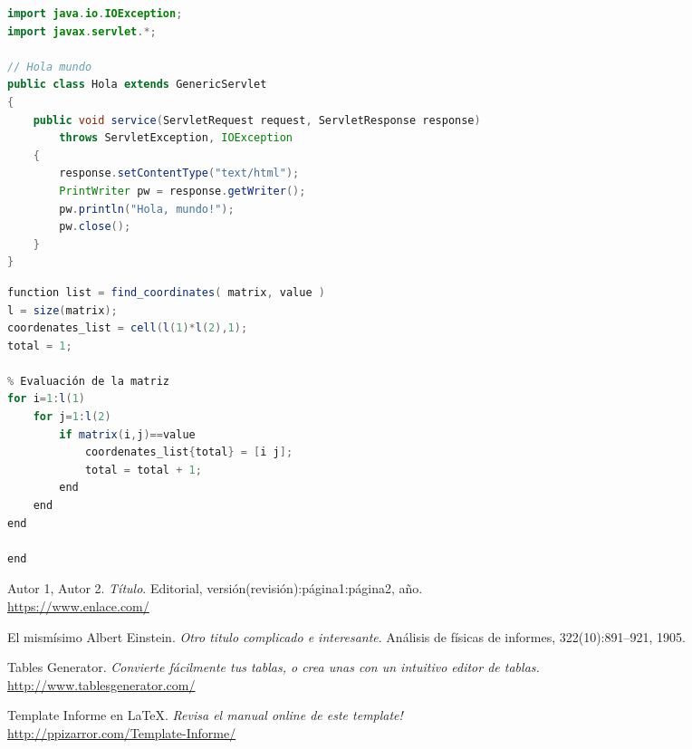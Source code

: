\lstset{style=Java}
\begin{lstlisting}[language=Java, caption=Ejemplo en Java]
import java.io.IOException; 
import javax.servlet.*;

// Hola mundo
public class Hola extends GenericServlet 
{
    public void service(ServletRequest request, ServletResponse response)
        throws ServletException, IOException
    {
        response.setContentType("text/html");
        PrintWriter pw = response.getWriter();
        pw.println("Hola, mundo!");
        pw.close();
    }
}
\end{lstlisting}


\lstset{style=Matlab}
\begin{lstlisting}[language=Java, caption=Ejemplo en Matlab]
function list = find_coordinates( matrix, value )
l = size(matrix);
coordenates_list = cell(l(1)*l(2),1);
total = 1;

% Evaluación de la matriz
for i=1:l(1)
    for j=1:l(2)
        if matrix(i,j)==value
            coordenates_list{total} = [i j];
            total = total + 1;
        end
    end
end

end
\end{lstlisting}


\newpage
\begin{thebibliography}{99}
	
		 Autor 1, Autor 2.
		\textit{Título}.
		Editorial, versión(revisión):página1:página2, año.
		\\\url{https://www.enlace.com/}
		
		 El mismísimo Albert Einstein. 
		\textit{Otro titulo complicado e interesante}. 
		Análisis de físicas de informes, 322(10):891–921, 1905.
	
		 Tables Generator.
		\textit{Convierte fácilmente tus tablas, o crea unas con un intuitivo editor de tablas.}
		\\\url{http://www.tablesgenerator.com/}
		
		 Template Informe en \LaTeX.
		\textit{Revisa el manual online de este template!}
		\\\url{http://ppizarror.com/Template-Informe/}
	
\end{thebibliography}